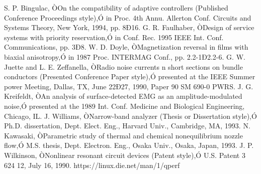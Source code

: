 \documentclass[letterpaper, 11 pt, conference]{ieeeconf}  %
\begin{document}
\begin{thebibliography}{99}
 S. P. Bingulac, ÒOn the compatibility of adaptive controllers (Published Conference Proceedings style),Ó in Proc. 4th Annu. Allerton Conf. Circuits and Systems Theory, New York, 1994, pp. 8Ð16.
 G. R. Faulhaber, ÒDesign of service systems with priority reservation,Ó in Conf. Rec. 1995 IEEE Int. Conf. Communications, pp. 3Ð8.
 W. D. Doyle, ÒMagnetization reversal in films with biaxial anisotropy,Ó in 1987 Proc. INTERMAG Conf., pp. 2.2-1Ð2.2-6.
 G. W. Juette and L. E. Zeffanella, ÒRadio noise currents n short sections on bundle conductors (Presented Conference Paper style),Ó presented at the IEEE Summer power Meeting, Dallas, TX, June 22Ð27, 1990, Paper 90 SM 690-0 PWRS.
 J. G. Kreifeldt, ÒAn analysis of surface-detected EMG as an amplitude-modulated noise,Ó presented at the 1989 Int. Conf. Medicine and Biological Engineering, Chicago, IL.
 J. Williams, ÒNarrow-band analyzer (Thesis or Dissertation style),Ó Ph.D. dissertation, Dept. Elect. Eng., Harvard Univ., Cambridge, MA, 1993. 
 N. Kawasaki, ÒParametric study of thermal and chemical nonequilibrium nozzle flow,Ó M.S. thesis, Dept. Electron. Eng., Osaka Univ., Osaka, Japan, 1993.
 J. P. Wilkinson, ÒNonlinear resonant circuit devices (Patent style),Ó U.S. Patent 3 624 12, July 16, 1990. 
 https://linux.die.net/man/1/qperf





\end{thebibliography}
\fi
\end{document}
